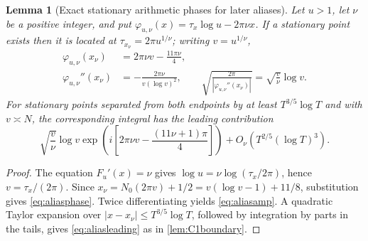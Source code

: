 \documentclass[11pt,reqno]{amsart}
\numberwithin{equation}{section}
\newtheorem{lemma}[theorem]{Lemma}
\begin{document}
\begin{lemma}[Exact stationary arithmetic phases for later aliases]
\label{lem:higheraliases}
Let $u>1$, let $\nu$ be a positive integer, and put
$\varphi_{u,\nu}(x)=\tau_x\log u-2\pi\nu x$.
If a stationary point exists then it is located at
$\tau_{x_\nu}=2\pi u^{1/\nu}$; writing $v=u^{1/\nu}$,
\begin{align}
\varphi_{u,\nu}(x_\nu)&=2\pi\nu v-\frac{11\pi\nu}{4},
\label{eq:aliasphase}\\
\varphi_{u,\nu}''(x_\nu)&=-\frac{2\pi\nu}{v(\log v)^2},\qquad
\sqrt{\frac{2\pi}{|\varphi_{u,\nu}''(x_\nu)|}}
=\sqrt{\frac v\nu}\log v.\label{eq:aliasamp}
\end{align}
For stationary points separated from both endpoints by at least
$T^{3/5}\log T$ and with $v\asymp N$, the corresponding
integral has the leading contribution
\begin{equation}\label{eq:aliasleading}
\sqrt{\frac v\nu}\log v
\exp\!\left(i\left[2\pi\nu v-
\frac{(11\nu+1)\pi}{4}\right]\right)
+O_\nu(T^{2/5}(\log T)^3).
\end{equation}
\end{lemma}
\begin{proof}
The equation $F_u'(x)=\nu$ gives
$\log u=\nu\log(\tau_x/2\pi)$, hence $v=\tau_x/(2\pi)$.
Since $x_\nu=N_0(2\pi v)+1/2=v(\log v-1)+11/8$,
substitution gives \eqref{eq:aliasphase}.
Twice differentiating yields \eqref{eq:aliasamp}.
A quadratic Taylor expansion over $|x-x_\nu|\le
T^{3/5}\log T$, followed by integration by parts in the tails,
gives \eqref{eq:aliasleading} as in \cref{lem:C1boundary}.
\end{proof}
\end{document}

